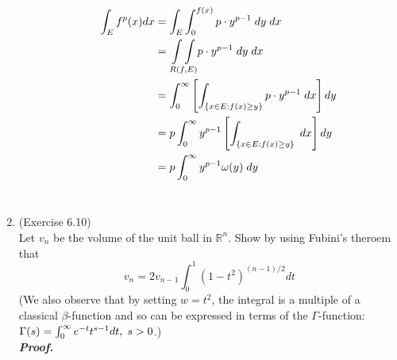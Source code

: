 \documentclass[a4paper,11pt]{article}
\begin{document}
\begin{enumerate}
\begin{enumerate}
 			$$\begin{aligned}
 			\int_E f^p(x) dx
 			&= \int_E \int_0^{f(x)} p \cdot y^{p-1} \hspace{0.1cm} dy \hspace{0.1cm} dx\\
 			&= \underset{R(f,E)}{\int \int} p \cdot y^{p-1} \hspace{0.1cm} dy \hspace{0.1cm} dx\\
 			&= \int_0^\infty \left[ \int_{\{x \in E: f(x) \geq y \}} p \cdot y^{p-1} \hspace{0.1cm} dx \right] dy\\
 			&= p \int_0^\infty y^{p-1} \left[ \int_{\{x \in E: f(x) \geq y \}} \hspace{0.1cm} dx \right] dy\\
 			&= p \int_0^\infty y^{p-1} \omega(y) \hspace{0.1cm} dy
 			\end{aligned}$$\\
 		\end{enumerate}






	\item (Exercise 6.10)\\
		Let $v_n$ be the volume of the unit ball in $\mathbb{R}^n$. Show by using Fubini's theroem that
		$$v_n = 2v_{n-1} \int_0^1 \left( 1 - t^2 \right)^{(n-1)/2} dt$$
		(We also observe that by setting $w = t^2$, the integral is a multiple of a classical $\beta$-function and so can be expressed in terms of the $\Gamma$-function: $\Gamma(s) = \int_0^\infty e^{-t} t^{s-1} dt, \hspace{0.1cm} s > 0$.)\\
	
 		\textit{\textbf {Proof.}}\\


\end{enumerate}
\end{document}
